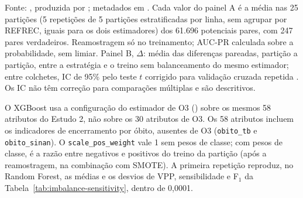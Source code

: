 \par\smallskip\noindent Fonte: , produzida por ; metadados em . Cada valor do painel A é a média nas 25 partições (5 repetições de 5 partições estratificadas por linha, sem agrupar por REFREC, iguais para os dois estimadores) dos 61.696 potenciais pares, com 247 pares verdadeiros. Reamostragem só no treinamento; AUC-PR calculada sobre a probabilidade, sem limiar. Painel B, $\Delta$: média das diferenças pareadas, partição a partição, entre a estratégia e o treino sem balanceamento do mesmo estimador; entre colchetes, IC de 95\% pelo teste $t$ corrigido para validação cruzada repetida \cite{Nadeau2003inference}. Os IC não têm correção para comparações múltiplas e são descritivos.

\noindent O XGBoost usa a configuração do estimador de O3 () sobre os mesmos 58 atributos do Estudo 2, não sobre os 30 atributos de O3. Os 58 atributos incluem os indicadores de encerramento por óbito, ausentes de O3 (\texttt{obito\_tb} e \texttt{obito\_\allowbreak sinan}). O \texttt{scale\_pos\_weight} vale 1 sem pesos de classe; com pesos de classe, é a razão entre negativos e positivos do treino da partição (após a reamostragem, na combinação com SMOTE). A primeira repetição reproduz, no Random Forest, as médias e os desvios de VPP, sensibilidade e F$_1$ da Tabela~\ref{tab:imbalance-sensitivity}, dentro de 0,0001.
\par
\endgroup
